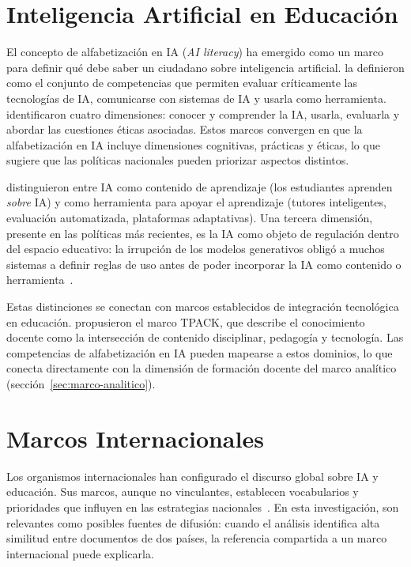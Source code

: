 \section{Inteligencia Artificial en Educación}
\label{sec:ia-educacion}

El concepto de alfabetización en IA (\textit{AI literacy}) ha emergido como un marco para definir qué debe saber un ciudadano sobre inteligencia artificial. \citet{long2020ailiteracy} la definieron como el conjunto de competencias que permiten evaluar críticamente las tecnologías de IA, comunicarse con sistemas de IA y usarla como herramienta. \citet{ng2021ailiteracy} identificaron cuatro dimensiones: conocer y comprender la IA, usarla, evaluarla y abordar las cuestiones éticas asociadas. Estos marcos convergen en que la alfabetización en IA incluye dimensiones cognitivas, prácticas y éticas, lo que sugiere que las políticas nacionales pueden priorizar aspectos distintos.

\citet{holmes2019aied} distinguieron entre IA como contenido de aprendizaje (los estudiantes aprenden \emph{sobre} IA) y como herramienta para apoyar el aprendizaje (tutores inteligentes, evaluación automatizada, plataformas adaptativas). Una tercera dimensión, presente en las políticas más recientes, es la IA como objeto de regulación dentro del espacio educativo: la irrupción de los modelos generativos obligó a muchos sistemas a definir reglas de uso antes de poder incorporar la IA como contenido o herramienta~\citep{unesco2023genai}.

Estas distinciones se conectan con marcos establecidos de integración tecnológica en educación. \citet{mishra2006technological} propusieron el marco TPACK, que describe el conocimiento docente como la intersección de contenido disciplinar, pedagogía y tecnología. Las competencias de alfabetización en IA pueden mapearse a estos dominios, lo que conecta directamente con la dimensión de formación docente del marco analítico (sección~\ref{sec:marco-analitico}).


\section{Marcos Internacionales}
\label{sec:marcos-internacionales}

Los organismos internacionales han configurado el discurso global sobre IA y educación. Sus marcos, aunque no vinculantes, establecen vocabularios y prioridades que influyen en las estrategias nacionales~\citep{bareis2022talking}. En esta investigación, son relevantes como posibles fuentes de difusión: cuando el análisis identifica alta similitud entre documentos de dos países, la referencia compartida a un marco internacional puede explicarla.

